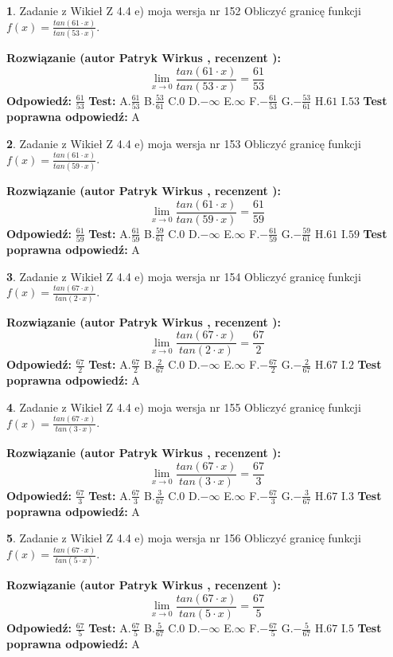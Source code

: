 \documentclass[12pt, a4paper]{article}
\theoremstyle{definition} %
\newtheorem{zad}{}
\newcommand{\zadStart}[1]{\begin{zad}#1\newline}
\newcommand{\zadStop}{\end{zad}}
\newcommand{\rozwStart}[2]{\noindent \textbf{Rozwiązanie (autor #1 , recenzent #2): }\newline}
\newcommand{\rozwStop}{\newline}
\newcommand{\odpStart}{\noindent \textbf{Odpowiedź:}\newline}
\newcommand{\odpStop}{\newline}
\newcommand{\testStart}{\noindent \textbf{Test:}\newline}
\newcommand{\testStop}{\newline}
\newcommand{\kluczStart}{\noindent \textbf{Test poprawna odpowiedź:}\newline}
\newcommand{\kluczStop}{\newline}
\begin{document}
\zadStart{Zadanie z Wikieł Z 4.4 e) moja wersja nr 152}
Obliczyć granicę funkcji $f(x)=\frac{tan(61\cdot x)}{tan(53\cdot x)}$.
\zadStop
\rozwStart{Patryk Wirkus}{}
$$\lim\limits_{x\to 0}\frac{tan(61\cdot x)}{tan(53\cdot x)}=
\frac{61}{53}$$
\rozwStop
\odpStart
$\frac{61}{53}$
\odpStop
\testStart
A.$\frac{61}{53}$
B.$\frac{53}{61}$
C.$0$
D.$-\infty$
E.$\infty$
F.$-\frac{61}{53}$
G.$-\frac{53}{61}$
H.$61$
I.$53$
\testStop
\kluczStart
A
\kluczStop



\zadStart{Zadanie z Wikieł Z 4.4 e) moja wersja nr 153}
Obliczyć granicę funkcji $f(x)=\frac{tan(61\cdot x)}{tan(59\cdot x)}$.
\zadStop
\rozwStart{Patryk Wirkus}{}
$$\lim\limits_{x\to 0}\frac{tan(61\cdot x)}{tan(59\cdot x)}=
\frac{61}{59}$$
\rozwStop
\odpStart
$\frac{61}{59}$
\odpStop
\testStart
A.$\frac{61}{59}$
B.$\frac{59}{61}$
C.$0$
D.$-\infty$
E.$\infty$
F.$-\frac{61}{59}$
G.$-\frac{59}{61}$
H.$61$
I.$59$
\testStop
\kluczStart
A
\kluczStop



\zadStart{Zadanie z Wikieł Z 4.4 e) moja wersja nr 154}
Obliczyć granicę funkcji $f(x)=\frac{tan(67\cdot x)}{tan(2\cdot x)}$.
\zadStop
\rozwStart{Patryk Wirkus}{}
$$\lim\limits_{x\to 0}\frac{tan(67\cdot x)}{tan(2\cdot x)}=
\frac{67}{2}$$
\rozwStop
\odpStart
$\frac{67}{2}$
\odpStop
\testStart
A.$\frac{67}{2}$
B.$\frac{2}{67}$
C.$0$
D.$-\infty$
E.$\infty$
F.$-\frac{67}{2}$
G.$-\frac{2}{67}$
H.$67$
I.$2$
\testStop
\kluczStart
A
\kluczStop



\zadStart{Zadanie z Wikieł Z 4.4 e) moja wersja nr 155}
Obliczyć granicę funkcji $f(x)=\frac{tan(67\cdot x)}{tan(3\cdot x)}$.
\zadStop
\rozwStart{Patryk Wirkus}{}
$$\lim\limits_{x\to 0}\frac{tan(67\cdot x)}{tan(3\cdot x)}=
\frac{67}{3}$$
\rozwStop
\odpStart
$\frac{67}{3}$
\odpStop
\testStart
A.$\frac{67}{3}$
B.$\frac{3}{67}$
C.$0$
D.$-\infty$
E.$\infty$
F.$-\frac{67}{3}$
G.$-\frac{3}{67}$
H.$67$
I.$3$
\testStop
\kluczStart
A
\kluczStop



\zadStart{Zadanie z Wikieł Z 4.4 e) moja wersja nr 156}
Obliczyć granicę funkcji $f(x)=\frac{tan(67\cdot x)}{tan(5\cdot x)}$.
\zadStop
\rozwStart{Patryk Wirkus}{}
$$\lim\limits_{x\to 0}\frac{tan(67\cdot x)}{tan(5\cdot x)}=
\frac{67}{5}$$
\rozwStop
\odpStart
$\frac{67}{5}$
\odpStop
\testStart
A.$\frac{67}{5}$
B.$\frac{5}{67}$
C.$0$
D.$-\infty$
E.$\infty$
F.$-\frac{67}{5}$
G.$-\frac{5}{67}$
H.$67$
I.$5$
\testStop
\kluczStart
A
\kluczStop
\end{document}

